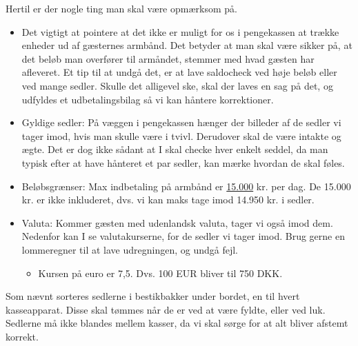 Hertil er der nogle ting man skal være opmærksom på.
\begin{itemize}
  \item Det vigtigt at pointere at det ikke er muligt for 
  os i pengekassen at trække enheder ud af gæsternes armbånd.
  Det betyder at man skal være sikker på, at det beløb man overfører til armåndet, 
  stemmer med hvad gæsten har afleveret. Et tip til at undgå det, er
  at lave saldocheck ved høje beløb eller ved mange sedler.
  Skulle det alligevel ske, skal der laves en sag på det, og udfyldes et
  udbetalingsbilag så vi kan håntere korrektioner.
  \item Gyldige sedler: På væggen i pengekassen hænger der billeder af de sedler vi tager imod, 
  hvis man skulle være i tvivl. Derudover skal de være intakte og ægte. 
  Det er dog ikke sådant at I skal checke hver enkelt seddel, da man typisk efter at have 
  hånteret et par sedler, kan mærke hvordan de skal føles.
  \item Beløbsgrænser: Max indbetaling på armbånd er \underline{15.000} kr. per dag. 
  De 15.000 kr. er ikke inkluderet, dvs. vi kan maks tage imod 14.950 kr. i sedler.
  \item Valuta: Kommer gæsten med udenlandsk valuta, tager vi også imod dem. Nedenfor 
  kan I se valutakurserne, for de sedler vi tager imod. Brug gerne en lommeregner til 
  at lave udregningen, og undgå fejl.
  \begin{itemize}
    \item Kursen på euro er 7,5. Dvs. 100 EUR bliver til 750 DKK.
  \end{itemize}
\end{itemize}

Som nævnt sorteres sedlerne i bestikbakker under bordet, en til hvert kasseapparat. 
Disse skal tømmes når de er ved at være fyldte, eller ved luk. Sedlerne må ikke blandes mellem kasser, 
da vi skal sørge for at alt bliver afstemt korrekt.

